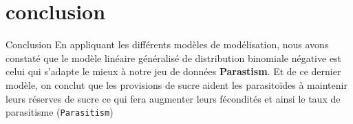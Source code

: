 \documentclass[aspectratio=1610]{beamer}
\begin{document}
\section{conclusion}
\begin{frame}{Conclusion}
En appliquant les différents modèles de modélisation, nous avons constaté que le modèle linéaire généralisé de distribution binomiale négative est celui qui s'adapte le mieux à notre jeu de données \textbf{Parastism}.
Et de ce dernier modèle, on conclut que les provisions de sucre aident les parasitoïdes à maintenir leurs réserves de sucre ce qui fera augmenter leurs fécondités et ainsi le taux de parasitisme (\texttt{Parasitism})

\end{frame}
\end{document}
